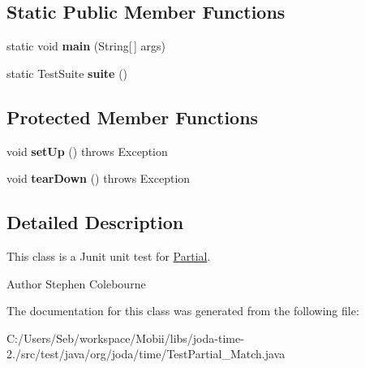 \subsection*{Static Public Member Functions}
\begin{DoxyCompactItemize}
\item 
\hypertarget{classorg_1_1joda_1_1time_1_1_test_partial___match_a11d770df61934e99150e0f2c8fdcbafe}{static void {\bfseries main} (String\mbox{[}$\,$\mbox{]} args)}\label{classorg_1_1joda_1_1time_1_1_test_partial___match_a11d770df61934e99150e0f2c8fdcbafe}

\item 
\hypertarget{classorg_1_1joda_1_1time_1_1_test_partial___match_a9d83a8141bbf4f956e055d9176e93ec2}{static Test\-Suite {\bfseries suite} ()}\label{classorg_1_1joda_1_1time_1_1_test_partial___match_a9d83a8141bbf4f956e055d9176e93ec2}

\end{DoxyCompactItemize}
\subsection*{Protected Member Functions}
\begin{DoxyCompactItemize}
\item 
\hypertarget{classorg_1_1joda_1_1time_1_1_test_partial___match_a7f2cb28a4518db79eeb9580606db6b32}{void {\bfseries set\-Up} ()  throws Exception }\label{classorg_1_1joda_1_1time_1_1_test_partial___match_a7f2cb28a4518db79eeb9580606db6b32}

\item 
\hypertarget{classorg_1_1joda_1_1time_1_1_test_partial___match_a3a3ad96746d2ad974828461e001e4299}{void {\bfseries tear\-Down} ()  throws Exception }\label{classorg_1_1joda_1_1time_1_1_test_partial___match_a3a3ad96746d2ad974828461e001e4299}

\end{DoxyCompactItemize}


\subsection{Detailed Description}
This class is a Junit unit test for \hyperlink{classorg_1_1joda_1_1time_1_1_partial}{Partial}.

\begin{DoxyAuthor}{Author}
Stephen Colebourne 
\end{DoxyAuthor}


The documentation for this class was generated from the following file\-:\begin{DoxyCompactItemize}
\item 
C\-:/\-Users/\-Seb/workspace/\-Mobii/libs/joda-\/time-\/2./src/test/java/org/joda/time/Test\-Partial\-\_\-\-Match.\-java\end{DoxyCompactItemize}
